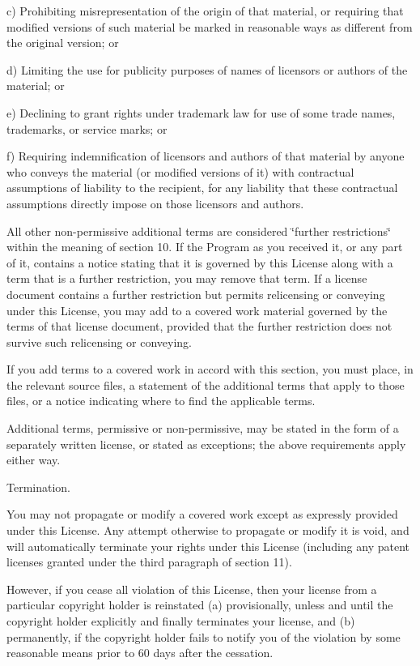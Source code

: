 c) Prohibiting misrepresentation of the origin of that material, or requiring that modified versions of such material be marked in reasonable ways as different from the original version; or

d) Limiting the use for publicity purposes of names of licensors or authors of the material; or

e) Declining to grant rights under trademark law for use of some trade names, trademarks, or service marks; or

f) Requiring indemnification of licensors and authors of that material by anyone who conveys the material (or modified versions of it) with contractual assumptions of liability to the recipient, for any liability that these contractual assumptions directly impose on those licensors and authors.

All other non-\/permissive additional terms are considered \char`\"{}further
 restrictions\char`\"{} within the meaning of section 10. If the Program as you received it, or any part of it, contains a notice stating that it is governed by this License along with a term that is a further restriction, you may remove that term. If a license document contains a further restriction but permits relicensing or conveying under this License, you may add to a covered work material governed by the terms of that license document, provided that the further restriction does not survive such relicensing or conveying.

If you add terms to a covered work in accord with this section, you must place, in the relevant source files, a statement of the additional terms that apply to those files, or a notice indicating where to find the applicable terms.

Additional terms, permissive or non-\/permissive, may be stated in the form of a separately written license, or stated as exceptions; the above requirements apply either way.


\begin{DoxyEnumerate}
\item Termination.
\end{DoxyEnumerate}

You may not propagate or modify a covered work except as expressly provided under this License. Any attempt otherwise to propagate or modify it is void, and will automatically terminate your rights under this License (including any patent licenses granted under the third paragraph of section 11).

However, if you cease all violation of this License, then your license from a particular copyright holder is reinstated (a) provisionally, unless and until the copyright holder explicitly and finally terminates your license, and (b) permanently, if the copyright holder fails to notify you of the violation by some reasonable means prior to 60 days after the cessation.

